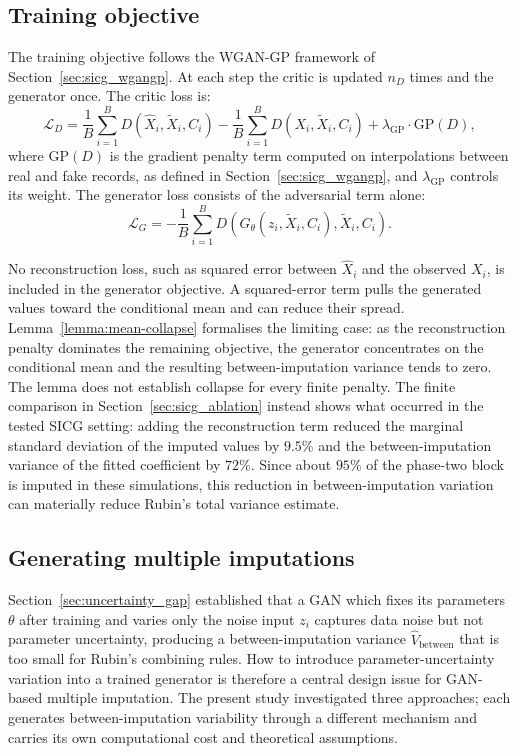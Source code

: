 \subsection{Training objective}
\label{sec:sicg_training}

The training objective follows the WGAN-GP framework of Section~\ref{sec:sicg_wgangp}. At each step the critic is updated $n_D$ times and the generator once. The critic loss is:
\begin{equation}
\mathcal{L}_D = \frac{1}{B}\sum_{i=1}^B D(\hat{X}_i, \tilde{X}_i, C_i) - \frac{1}{B}\sum_{i=1}^B D(X_i, \tilde{X}_i, C_i) + \lambda_{\text{GP}} \cdot \text{GP}(D),
\label{eq:sicg-d-loss}
\end{equation}
where $\text{GP}(D)$ is the gradient penalty term computed on interpolations between real and fake records, as defined in Section~\ref{sec:sicg_wgangp}, and $\lambda_{\text{GP}}$ controls its weight. The generator loss consists of the adversarial term alone:
\begin{equation}
\mathcal{L}_G = -\frac{1}{B}\sum_{i=1}^B D(G_\theta(z_i, \tilde{X}_i, C_i), \tilde{X}_i, C_i).
\label{eq:sicg-g-loss}
\end{equation}

No reconstruction loss, such as squared error between $\hat{X}_i$ and the observed $X_i$, is included in the generator objective. A squared-error term pulls the generated values toward the conditional mean and can reduce their spread. Lemma~\ref{lemma:mean-collapse} formalises the limiting case: as the reconstruction penalty dominates the remaining objective, the generator concentrates on the conditional mean and the resulting between-imputation variance tends to zero. The lemma does not establish collapse for every finite penalty. The finite comparison in Section~\ref{sec:sicg_ablation} instead shows what occurred in the tested SICG setting: adding the reconstruction term reduced the marginal standard deviation of the imputed values by $9.5\%$ and the between-imputation variance of the fitted coefficient by $72\%$. Since about $95\%$ of the phase-two block is imputed in these simulations, this reduction in between-imputation variation can materially reduce Rubin's total variance estimate.


\subsection{Generating multiple imputations}
\label{sec:sicg_mi}

Section~\ref{sec:uncertainty_gap} established that a GAN which fixes its parameters $\theta$ after training and varies only the noise input $z_i$ captures data noise but not parameter uncertainty, producing a between-imputation variance $\hat{V}_{\text{between}}$ that is too small for Rubin's combining rules. How to introduce parameter-uncertainty variation into a trained generator is therefore a central design issue for GAN-based multiple imputation. The present study investigated three approaches; each generates between-imputation variability through a different mechanism and carries its own computational cost and theoretical assumptions.

